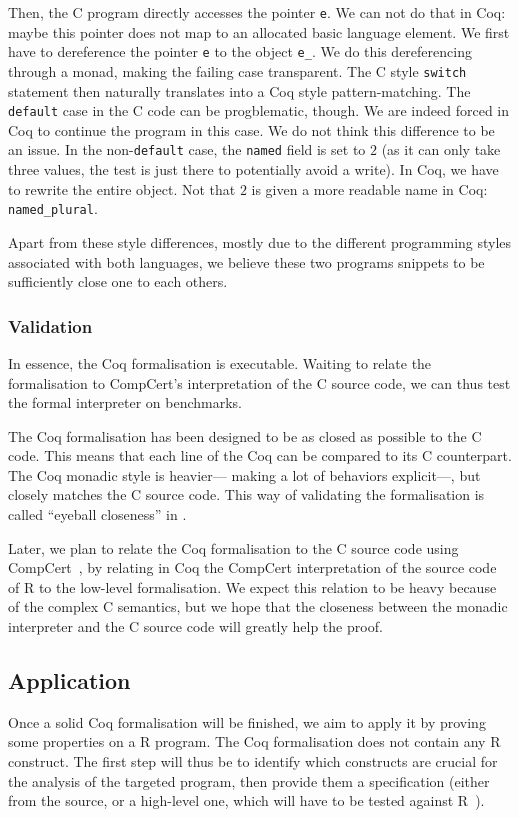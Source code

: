 \documentclass{article}
\newcommand\Coq{Coq}
\newcommand\R{R}
\newcommand\Cn{C}
\begin{document}
Then, the \Cn{} program directly accesses the pointer \texttt{e}.
We can not do that in \Coq{}:
maybe this pointer does not map to an allocated basic language element.
We first have to dereference the pointer \texttt{e}
to the object \texttt{e_}.
We do this dereferencing through a monad,
making the failing case transparent.
The \Cn{} style \texttt{switch} statement then naturally translates
into a \Coq{} style pattern-matching.
The \texttt{default} case in the \Cn{} code can be progblematic, though.
We are indeed forced in \Coq{} to continue the program in this case.
We do not think this difference to be an issue.
In the non-\texttt{default} case,
the \texttt{named} field is set to \(2\)
(as it can only take three values, the test is just there to potentially avoid a write).
In \Coq{}, we have to rewrite the entire object.
Not that \(2\) is given a more readable name in \Coq{}:
\texttt{named_plural}.

Apart from these style differences,
mostly due to the different programming styles associated with both languages,
we believe these two programs snippets to be sufficiently close one to each others.


\subsubsection{Validation}
\label{sec:validation}

In essence, the \Coq{} formalisation is executable.
Waiting to relate the formalisation to CompCert's interpretation
of the \Cn{} source code, we can thus test the formal interpreter
on benchmarks.

The \Coq{} formalisation has been designed to be as closed as
possible to the \Cn{} code.
This means that each line of the \Coq{} can be compared to its
\Cn{} counterpart.
The \Coq{} monadic style is heavier—%
making a lot of behaviors explicit—,
but closely matches the \Cn{} source code.
This way of validating the formalisation is called “eyeball closeness”
in \cite{bodin2014trusted}.

Later, we plan to relate the \Coq{} formalisation
to the \Cn{} source code using CompCert~\parencite{Leroy-Compcert-CACM},
by relating in \Coq{} the CompCert interpretation of the source code of \R{}
to the low-level formalisation.
We expect this relation to be heavy because of the complex \Cn{} semantics,
but we hope that the closeness between the monadic interpreter and the \Cn{}
source code will greatly help the proof.


\subsection{Application}
\label{sec:application}

Once a solid \Coq{} formalisation will be finished,
we aim to apply it by proving some properties on a \R{} program.
%
The \Coq{} formalisation does not contain any \R{} construct.
The first step will thus be to identify which constructs
are crucial for the analysis of the targeted program,
then provide them a specification
(either from the source, or a high-level one, which will have
to be tested against \R{}~\parencite{maj2013testr}).


\printbibliography
\end{document}
